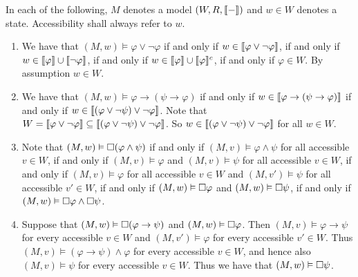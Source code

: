 \documentclass{article}
\begin{document}
\maketitle

\begin{ex}
In each of the following, $M$ denotes a model $(W,R,\llbracket{-}\rrbracket)$ and $w\in W$
denotes a state. Accessibility shall always refer to $w$.
\begin{enumerate} 
\item We have that $(M,w)\models \varphi\lor\neg\varphi$ if and only if $w\in \llbracket\varphi\lor
\neg\varphi\rrbracket$, if and only if $w\in \llbracket\varphi\rrbracket\cup\llbracket\neg\varphi\rrbracket$,
if and only if $w\in\llbracket\varphi\rrbracket\cup\llbracket\varphi\rrbracket^c$, if and only if
$\varphi\in W$. By assumption $w\in W$.
\item We have that $(M,w)\models \varphi\to(\psi\to\varphi)$ if and only if
$w\in\llbracket\varphi\to(\psi\to\varphi)\rrbracket$ if and only if $w\in
\llbracket(\varphi\lor\neg\psi)\lor\neg\varphi\rrbracket$. Note that $W=\llbracket\varphi\lor\neg
\varphi\rrbracket\subseteq \llbracket(\varphi\lor\neg\psi)\lor\neg\varphi\rrbracket$. So
$w\in \llbracket(\varphi\lor\neg\psi)\lor\neg\varphi\rrbracket$ for all $w\in W$.
\item Note that $(M,w)\vDash\square(\varphi\land\psi)$ if and only if $(M,v)\models\varphi\land\psi$ for all accessible $v\in W$, if and only if $(M,v)\models\varphi$ and $(M,v)\models\psi$ for all accessible $v\in W$, if and only if $(M,v)\models\varphi$ for all accessible $v\in W$ and $(M,v')\models\psi$ for all accessible $v'\in W$, if and only if $(M,w)\vDash\square\varphi$ and $(M,w)\vDash\square\psi$, if and only if $(M,w)\vDash\square\varphi\land\square\psi$.
\item Suppose that $(M,w)\vDash\square(\varphi\to\psi)$ and $(M,w)\vDash\square\varphi$. Then $(M,v)\models\varphi\to\psi$ for every accessible $v\in W$ and $(M,v')\models \varphi$ for every accessible $v'\in W$. Thus $(M,v)\models(\varphi\to\psi)\land\varphi$ for every accessible $v\in W$, and hence also $(M,v)\models\psi$ for every accessible $v\in W$. Thus we have that $(M,w)\vDash\square\psi$.
\end{enumerate}
\end{ex}
\end{document}
